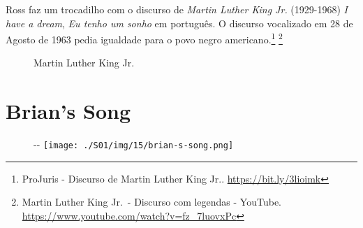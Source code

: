 \saveparinfos
\noindent
\begin{minipage}[c]{0.5\textwidth}\useparinfo

Ross faz um trocadilho com o discurso de \emph{Martin Luther King Jr.}
(1929-1968) \emph{I have a dream}, \emph{Eu tenho um sonho} em
português. O discurso vocalizado em 28 de Agosto de 1963 pedia igualdade
para o povo negro americano.\footnote{\sloppy ProJuris - Discurso de Martin Luther King Jr.. \url{https://bit.ly/3lioimk}}
\footnote{\sloppy Martin Luther King Jr. - Discurso com legendas - YouTube. \url{https://www.youtube.com/watch?v=fz_7luovxPc}}

\end{minipage}\hfill
\begin{minipage}[c]{0.5\textwidth}

\begin{figure}
  \centering
    \caption{Martin Luther King Jr.\label{fig:martin-luther-king-jr}}
\end{figure}

\end{minipage}

\hypertarget{brians-song}{%
\section{Brian's Song}\label{brians-song}}

\begin{figure}[!ht]
  \begin{adjustwidth}{-\oddsidemargin-1in}{-\rightmargin}
    \centering
    \texttt{[image: ./S01/img/15/brian-s-song.png]}
  \end{adjustwidth}
\end{figure}

